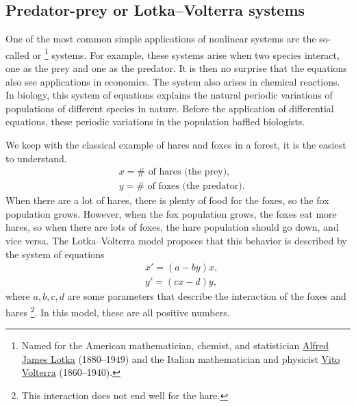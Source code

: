 \documentclass{ximera}
\begin{document}
\subsection{Predator-prey or Lotka--Volterra systems}

One of the most common simple applications of nonlinear systems are the so-called \emph{} or \emph{}%
\footnote{
    Named for the American mathematician, chemist, and statistician \href{https://en.wikipedia.org/wiki/Alfred_J._Lotka}{Alfred James Lotka} (1880--1949) and the Italian mathematician and physicist \href{https://en.wikipedia.org/wiki/Vito_Volterra}{Vito Volterra} (1860--1940).
    } 
systems.  For example, these systems arise when two species interact, one as the prey and one as the predator.  It is then no surprise that the equations also see applications in economics. The system also arises in chemical reactions. In biology, this system of equations explains the natural periodic variations of populations of different species in nature.  Before the application of differential equations, these periodic variations in the population baffled biologists. 

We keep with the classical example of hares and foxes in a forest, it is the easiest to understand.
\begin{equation*}
    \begin{aligned}
        & x = \# \text{ of hares (the prey),} \\
        & y = \# \text{ of foxes (the predator).}
    \end{aligned}
\end{equation*}
When there are a lot of hares, there is plenty of food for the foxes, so the fox population grows.  However, when the fox population grows, the foxes eat more hares, so when there are lots of foxes, the hare population should go down, and vice versa. The Lotka--Volterra model proposes that this behavior is described by the system of equations
\begin{equation*}
    \begin{aligned}
        & x' = (a-by)x, \\
        & y' = (cx-d)y,
    \end{aligned}
\end{equation*}
where $a,b,c,d$ are some parameters that describe the interaction of the foxes and hares%
\footnote{This interaction does not end well for the hare.}.  
In this model, these are all positive numbers. 
\end{document}
